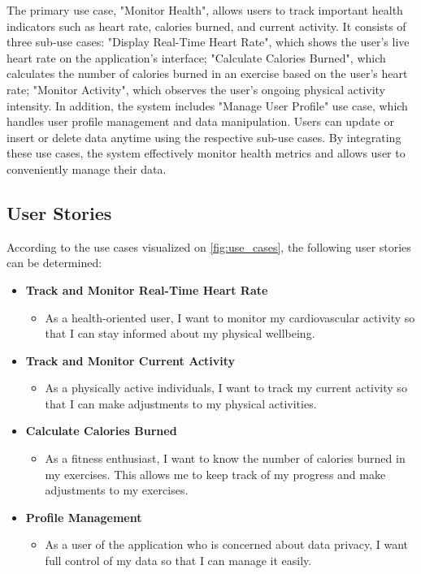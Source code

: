 The primary use case, "Monitor Health", allows users to track important health indicators such as heart rate, calories burned, and current activity. It consists of three sub-use cases: "Display Real-Time Heart Rate", which shows the user's live heart rate on the application's interface; "Calculate Calories Burned", which calculates the number of calories burned in an exercise based on the user's heart rate;  "Monitor Activity", which observes the user's ongoing physical activity intensity. In addition, the system includes "Manage User Profile" use case, which handles user profile management and data manipulation. Users can update or insert or delete data anytime using the respective sub-use cases. By integrating these use cases, the system effectively monitor health metrics and allows user to conveniently manage their data.

\subsection{User Stories}
\label{chap:user_stories}
According to the use cases visualized on \autoref{fig:use_cases}, the following user stories can be determined:

\begin{itemize}[label={},leftmargin=*]
    \item \textbf{Track and Monitor Real-Time Heart Rate}
      \begin{itemize}[label={},leftmargin=*]
        \item As a health-oriented user, I want to monitor my cardiovascular activity so that I can stay informed about my physical wellbeing.
      \end{itemize}

    \item \textbf{Track and Monitor Current Activity}
      \begin{itemize}[label={},leftmargin=*]
        \item As a physically active individuals, I want to track my current activity so that I can make adjustments to my physical activities.
      \end{itemize}

    \item \textbf{Calculate Calories Burned}
      \begin{itemize}[label={},leftmargin=*]
        \item As a fitness enthusiast, I want to know the number of calories burned in my exercises. This allows me to keep track of my progress and make adjustments to my exercises.
      \end{itemize}  

    \item \textbf{Profile Management}
      \begin{itemize}[label={},leftmargin=*]
        \item As a user of the application who is concerned about data privacy, I want full control of my data so that I can manage it easily. 
      \end{itemize}
  \end{itemize}


